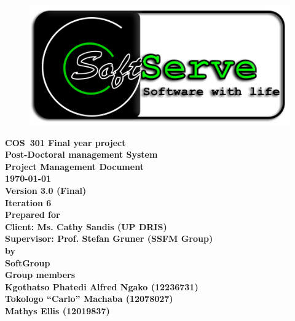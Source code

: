 \documentclass[12pt]{article}
\newcommand{\Title}{Project Management Document} %
\newcommand{\Class}{COS\ 301 Final year project} %
\newcommand{\ssr}{Soft\color{green}{Serve }\color{black}}
\newcommand{\version}{3.0 (Final)}
\newcommand{\iteration}{6}
\newcommand{\client}{Ms. Cathy Sandis (UP DRIS)}
\newcommand{\supervisor}{Prof. Stefan Gruner (SSFM Group)}
\newcommand{\project}{Post-Doctoral management System}
\begin{document}
\vspace{4em}

\begin{center}%

\begin{figure}[ht!]
\centering
\includegraphics{../Images_Docs/logo.png}
\end{figure}
\LARGE \bf \Class \\[0.25em]
\LARGE \bf \project \\[1em]
\LARGE \bf \Title \\[0.25em]
\large \bf \today\\
\bf Version \version\\
\bf Iteration \iteration\\[0.5em]
\Large \bf Prepared for \\Client: \client\\Supervisor: \supervisor
\Large \\\bf by \\
\Large {\bf \ssr Group }\\[0.5em]
\LARGE {\bf Group members}\\[0.25em]
\large
Kgothatso Phatedi Alfred Ngako (12236731) \\[0.5em]
Tokologo “Carlo” Machaba (12078027) \\[0.5em]
Mathys Ellis (12019837) \\[8em]

\end{center}%

\end{document}
